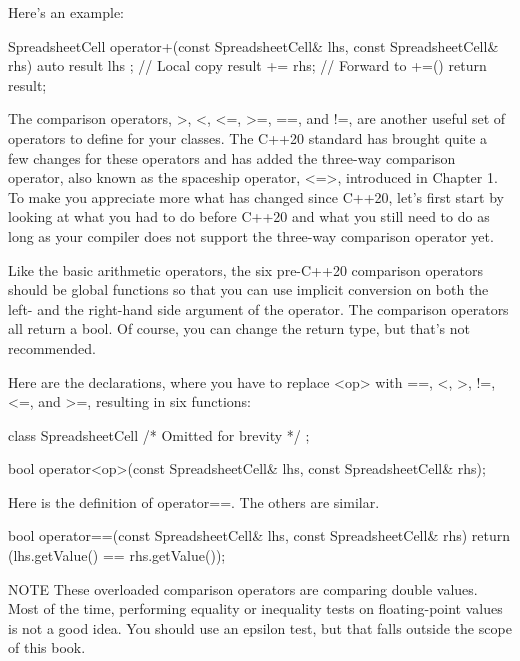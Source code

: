 Here’s an example:

\begin{cpp}
SpreadsheetCell operator+(const SpreadsheetCell& lhs, const SpreadsheetCell& rhs)
{
    auto result { lhs }; // Local copy
    result += rhs; // Forward to +=()
    return result;
}
\end{cpp}


The comparison operators, >, <, <=, >=, ==, and !=, are another useful set of operators to define for your classes. The C++20 standard has brought quite a few changes for these operators and has added the three-way comparison operator, also known as the spaceship operator, <=>, introduced in Chapter 1. To make you appreciate more what has changed since C++20, let’s first start by looking at what you had to do before C++20 and what you still need to do as long as your compiler does not support the three-way comparison operator yet.


Like the basic arithmetic operators, the six pre-C++20 comparison operators should be global functions so that you can use implicit conversion on both the left- and the right-hand side argument of the operator. The comparison operators all return a bool. Of course, you can change the return type, but that’s not recommended.

Here are the declarations, where you have to replace <op> with ==, <, >, !=, <=, and >=, resulting in six functions:

\begin{cpp}
class SpreadsheetCell { /* Omitted for brevity */ };

bool operator<op>(const SpreadsheetCell& lhs, const SpreadsheetCell& rhs);
\end{cpp}

Here is the definition of operator==. The others are similar.

\begin{cpp}
bool operator==(const SpreadsheetCell& lhs, const SpreadsheetCell& rhs)
{
    return (lhs.getValue() == rhs.getValue());
}
\end{cpp}

\begin{myNotic}{NOTE}
These overloaded comparison operators are comparing double values. Most of the time, performing equality or inequality tests on floating-point values is not a good idea. You should use an epsilon test, but that falls outside the scope of this book.
\end{myNotic}


